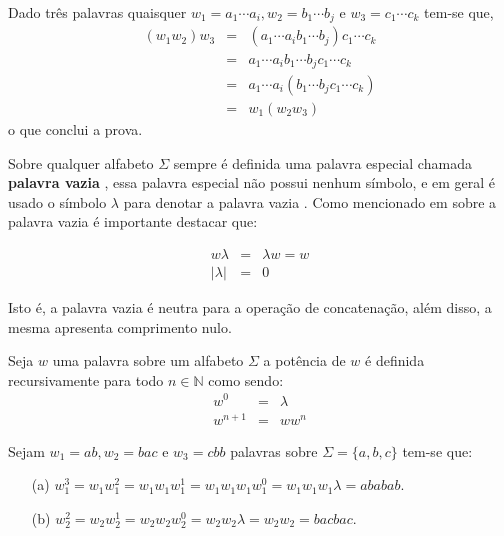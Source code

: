 \begin{prova}
	Dado três palavras quaisquer $w_1 = a_1\cdots a_i, w_2 = b_1\cdots b_j$ e $w_3 = c_1\cdots c_k$ tem-se que,
	\begin{eqnarray*}
		(w_1w_2)w_3 & = & (a_1\cdots a_ib_1\cdots b_j)c_1\cdots c_k\\
		& = & a_1\cdots a_ib_1\cdots b_jc_1\cdots c_k\\
		& = & a_1\cdots a_i(b_1\cdots b_jc_1\cdots c_k)\\
		& = & w_1(w_2w_3)
	\end{eqnarray*}
	o que conclui a prova.
\end{prova}

Sobre qualquer alfabeto $\Sigma$ sempre é definida uma palavra especial chamada \textbf{palavra vazia} \cite{hopcroft2008, linz2006}, essa palavra especial não possui nenhum símbolo, e em geral é usado o símbolo $\lambda$ para denotar a palavra vazia \cite{benjaLivro2010, valdi2016master}. Como mencionado em \cite{benjaLivro2010, valdi2020phd} sobre a palavra vazia é importante destacar que:

\begin{eqnarray}
	w\lambda & = & \lambda w = w\\
	|\lambda| & = &  0
\end{eqnarray}

Isto é, a palavra vazia é neutra para a operação de concatenação, além disso, a mesma apresenta comprimento nulo.

\begin{definicao}\label{def:PotenciaPalavras}
	Seja $w$ uma palavra sobre um alfabeto $\Sigma$ a potência de $w$ é definida recursivamente para todo $n \in \mathbb{N}$ como sendo:
	\begin{eqnarray}
		w^0 & = & \lambda\\
		w^{n+1} & = & ww^{n}
	\end{eqnarray}
\end{definicao}

\begin{exemplo}
	Sejam $w_1 = ab, w_2 = bac$ e $w_3 = cbb$ palavras sobre $\Sigma = \{a, b, c\}$ tem-se que:
	\begin{itemize}
		\item[(a)] $w_1^3 = w_1w_1^2 = w_1w_1w_1^1 = w_1w_1w_1w_1^0 = w_1w_1w_1\lambda = ababab$.
		\item[(b)] $w_2^2 = w_2w_2^1 = w_2w_2w_2^0 = w_2w_2\lambda = w_2w_2 = bacbac$.
	\end{itemize} 
\end{exemplo}

